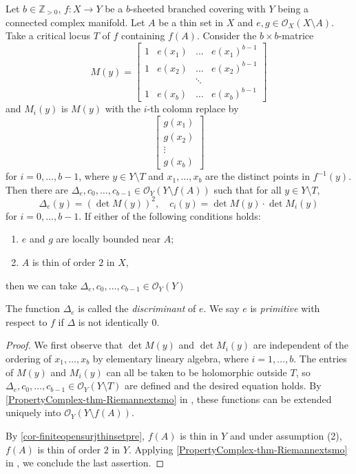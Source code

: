 \begin{proposition}\label{prop-determinanthol}
    Let $b\in \mathbb{Z}_{>0}$, $f:X\rightarrow Y$ be a $b$-sheeted branched covering with $Y$ being a connected complex manifold. Let $A$ be a thin set in $X$ and $e,g\in \mathcal{O}_X(X\setminus A)$. Take a critical locus $T$ of $f$ containing $f(A)$. 
    Consider the $b\times b$-matrice 
    \[
        M(y)=
        \begin{bmatrix}
            1 & e(x_1) & \dots & e(x_1)^{b-1}\\
            1 & e(x_2) & \dots & e(x_2)^{b-1}\\
            &&\ddots &\\
            1 & e(x_b) & \dots & e(x_b)^{b-1}
        \end{bmatrix}    
    \]
    and $M_i(y)$ is $M(y)$ with the $i$-th colomn replace by 
    \[
    \begin{bmatrix}
        g(x_1)\\
        g(x_2)\\
        \vdots\\
        g(x_b)
    \end{bmatrix}    
    \]
     for
     $i=0,\ldots,b-1$, where $y\in Y\setminus T$ and $x_1,\ldots,x_{b}$ are the distinct points in $f^{-1}(y)$. Then there are $\Delta_e,c_0,\ldots,c_{b-1}\in \mathcal{O}_Y(Y\setminus f(A))$ such that for all $y\in Y\setminus T$, 
     \[
        \Delta_e(y)=(\det M(y))^2,\quad c_i(y)=\det M(y)\cdot \det M_i(y) 
     \]
     for $i=0,\ldots,b-1$. If either of the following conditions holds:
     \begin{enumerate}
        \item $e$ and $g$ are locally bounded near $A$;
        \item $A$ is thin of order $2$ in $X$,
     \end{enumerate}
     then we can take $\Delta_e,c_0,\ldots,c_{b-1}\in \mathcal{O}_Y(Y)$
\end{proposition}
The function $\Delta_e$ is called the \emph{discriminant} of $e$. We say $e$ is \emph{primitive} with respect to $f$ if $\Delta$ is not identically $0$.
\begin{proof}
    We first observe that $\det M(y)$ and $\det M_i(y)$ are independent of the ordering of $x_1,\ldots,x_b$ by elementary lineary algebra, where $i=1,\ldots,b$. The entries of $M(y)$ and $M_i(y)$ can all be taken to be holomorphic outside $T$, so $\Delta_e,c_0,\ldots,c_{b-1}\in \mathcal{O}_Y(Y\setminus T)$ are defined and the desired equation holds. By \cref{PropertyComplex-thm-Riemannextsmo} in , these functions can be extended uniquely into $\mathcal{O}_Y(Y\setminus f(A))$. 

    By \cref{cor-finiteopensurjthinsetpre}, $f(A)$ is thin in $Y$ and under assumption (2), $f(A)$ is thin of order $2$ in $Y$. Applying \cref{PropertyComplex-thm-Riemannextsmo} in , we conclude the last assertion.
\end{proof}




